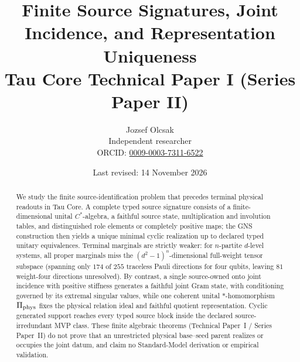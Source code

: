 \documentclass[11pt]{article}
\title{\textbf{Finite Source Signatures, Joint Incidence, and Representation Uniqueness}\\
\large Tau Core Technical Paper I (Series Paper II)}
\author{Jozsef Olcsak\\\small Independent researcher\\{\small ORCID: \href{https://orcid.org/0009-0003-7311-6522}{0009-0003-7311-6522}}}
\date{Last revised: 14 November 2026}
\begin{document}
\maketitle
\begin{abstract}
We study the finite source-identification problem that precedes terminal physical readouts in Tau Core. A complete typed source signature consists of a finite-dimensional unital \(C^*\)-algebra, a faithful source state, multiplication and involution tables, and distinguished role elements or completely positive maps; the GNS construction then yields a unique minimal cyclic realization up to declared typed unitary equivalences. Terminal marginals are strictly weaker: for \(n\)-partite \(d\)-level systems, all proper marginals miss the \((d^2-1)^n\)-dimensional full-weight tensor subspace (spanning only \(174\) of \(255\) traceless Pauli directions for four qubits, leaving \(81\) weight-four directions unresolved). By contrast, a single source-owned onto joint incidence with positive stiffness generates a faithful joint Gram state, with conditioning governed by its extremal singular values, while one coherent unital \(*\)-homomorphism \(\Pi_{\rm phys}\) fixes the physical relation ideal and faithful quotient representation. Cyclic generated support reaches every typed source block inside the declared source-irredundant MVP class. These finite algebraic theorems (Technical Paper~I / Series Paper~II) do not prove that an unrestricted physical base--seed parent realizes or occupies the joint datum, and claim no Standard-Model derivation or empirical validation.
\end{abstract}
\end{document}
